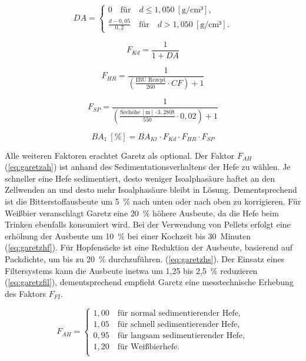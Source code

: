 \documentclass[a4paper,parskip=half]{scrartcl}
\newcommand{\BA}{\mathit{BA}}
\newcommand{\BAKt}{{\mathit{BA}}_{\mathit{Kt}}}
\newcommand{\uden}{\:[\text{g/cm³}]}
\newcommand{\uper}{\:[\text{\%}]}
\newcommand{\ume}{\:[\text{m}]}
\newcommand{\FKd}{F_{\mathit{Kd}}}
\newcommand{\FHR}{F_{\mathit{HR}}}
\newcommand{\FSP}{F_{\mathit{SP}}}
\newcommand{\FAH}{F_{\mathit{AH}}}
\newcommand{\FFil}{F_{\mathit{FI}}}
\begin{document}
\begin{equation}
\mathit{DA} = \begin{cases}
0 \quad \text{für} \quad d \le 1,050 \uden, \\
\frac{d - 0,05}{0,2} \quad \text{für} \quad d > 1,050 \uden.
\end{cases}
\label{eq:garetzga}
\end{equation}

\begin{equation}
\FKd = \frac{1}{1 + DA}
\label{eq:garetzkd}
\end{equation}

\begin{equation}
\FHR = \frac{1}{\left( \frac{\text{IBU Rezept}}{260} \cdot \mathit{CF} \right) + 1}
\label{eq:garetzhr}
\end{equation}

\begin{equation}
\FSP = \frac{1}{\left(\frac{\text{Seehöhe} \ume \cdot 3,2808}{550} \cdot 0,02 \right) + 1}
\label{eq:garetzsp}
\end{equation}

\begin{equation}
\BA_1 \uper = \BAKt \cdot \FKd \cdot \FHR \cdot \FSP
\label{eq:garetzba1}
\end{equation}

Alle weiteren Faktoren erachtet Garetz als optional. Der Faktor
$\FAH$ (\autoref{eq:garetzah}) ist anhand des Sedimentationsverhaltens
der Hefe zu wählen. Je schneller eine Hefe sedimentiert, desto
weniger Isoalphasäure haftet an den Zellwenden an und desto
mehr Isoalphasäure bleibt in Lösung. Dementsprechend ist die
Bitterstoffausbeute um 5~\% nach unten oder nach oben zu korrigieren. 
Für Weißbier veranschlagt Garetz eine 20~\% höhere Ausbeute,
da die Hefe beim Trinken ebenfalls konsumiert wird.
Bei der Verwendung von Pellets erfolgt eine erhöhung der
Ausbeute um 10~\% bei einer Kochzeit bis 30~Minuten (\autoref{eq:garetzhf}).
Für Hopfensäcke ist eine Reduktion der Ausbeute,
basierend auf Packdichte, um bis zu 20~\% durchzuführen.
(\autoref{eq:garetzhs}). Der Einsatz eines Filtersystems kann
die Ausbeute inetwa um 1,25 bis 2,5~\% reduzieren (\autoref{eq:garetzfil}),
dementsprechend empfieht Garetz eine messtechnische Erhebung des Faktors $\FFil$. \parencite[140\psq]{Garetz1994}

\begin{equation}
\FAH = \begin{cases}
1,00 \quad \text{für normal sedimentierender Hefe}, \\
1,05 \quad \text{für schnell sedimentierender Hefe}, \\
0,95 \quad \text{für langsam sedimentierender Hefe}, \\
1,20 \quad \text{für Weißbierhefe}. \\
\end{cases}
\label{eq:garetzah}
\end{equation}
\end{document}
